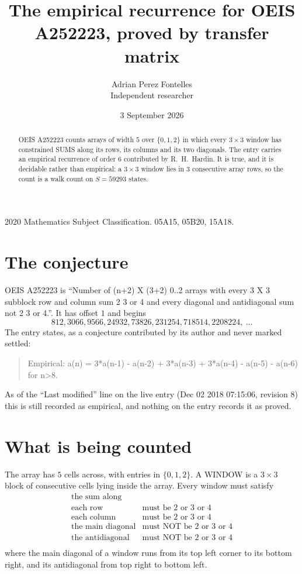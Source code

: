 \documentclass[11pt,a4paper]{article}
\title{The empirical recurrence for OEIS A252223, proved by transfer matrix}
\author{Adrian Perez Fontelles\\ \small Independent researcher}
\date{3 September 2026}
\theoremstyle{plain}
\theoremstyle{definition}
\begin{document}
\maketitle

\begin{abstract}
OEIS A252223 counts arrays of width $5$ over $\{0,1,2\}$ in which every $3\times3$ window has
constrained SUMS along its rows, its columns and its two diagonals. The entry carries an
empirical recurrence of order $6$ contributed by R.~H.~Hardin. It is true, and it is
decidable rather than empirical: a $3\times3$ window lies in $3$ consecutive array rows,
so the count is a walk count on $S=59293$ states.
\end{abstract}

\noindent\small 2020 Mathematics Subject Classification. 05A15, 05B20, 15A18.\normalsize

\section{The conjecture}

OEIS A252223 is ``Number of (n+2) X (3+2) 0..2 arrays with every 3 X 3 subblock row and column sum 2 3 or 4 and every diagonal and antidiagonal sum not 2 3 or 4.''. It has offset $1$ and begins
\[
812, 3066, 9566, 24932, 73826, 231254, 718514, 2208224,\ \dots
\]
The entry states, as a conjecture contributed by its author and never marked settled:
\begin{quote}
Empirical: a(n) = 3*a(n-1) - a(n-2) + 3*a(n-3) + 3*a(n-4) - a(n-5) - a(n-6) for n>8.
\end{quote}
As of the ``Last modified'' line on the live entry (Dec 02 2018 07:15:06, revision 8) this is still
recorded as empirical, and nothing on the entry records it as proved.

\section{What is being counted}

The array has $5$ cells across, with entries in $\{0,1,2\}$. A WINDOW is a $3\times3$ block
of consecutive cells lying inside the array. Every window must satisfy
\[
\begin{array}{ll}
\text{the sum along} & \text{} \\[2pt]
\text{each row} & \text{must be 2 or 3 or 4} \\
\text{each column} & \text{must be 2 or 3 or 4} \\
\text{the main diagonal} & \text{must NOT be 2 or 3 or 4} \\
\text{the antidiagonal} & \text{must NOT be 2 or 3 or 4} \\
\end{array}
\]
where the main diagonal of a window runs from its top left corner to its bottom right, and its
antidiagonal from top right to bottom left.
\end{document}
